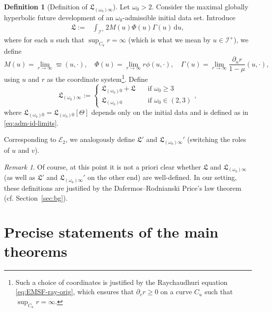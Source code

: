 \documentclass[10pt, reqno]{amsart}
\theoremstyle{definition}
\newtheorem{definition}[theorem]{Definition}
\theoremstyle{remark}
\newtheorem{remark}[theorem]{Remark}
\theoremstyle{conjecture}
\numberwithin{equation}{section}
\newcommand{\ud}{\mathrm{d}}
\newcommand{\rd}{\partial}
\newcommand{\0}{\emptyset}
\newcommand{\Gmm}{\Gamma}
\newcommand{\Tht}{\Theta}
\newcommand{\omg}{\omega}
\newcommand{\calI}{\mathcal I}
\newcommand{\NI}{\calI^{+}}						%
\newcommand{\Ext}{\mathscr{E}}
\begin{document}
\begin{definition}[Definition of $\mathfrak{L}_{(\omg_{0}) \infty}$]\label{def.L}
Let $\omg_0>2$. Consider the maximal globally hyperbolic future development of an $\omg_0$-admissible initial data set. Introduce
\begin{align} \label{eq:L-def}
	\mathfrak{L} :=& \int_{\NI} 2 M(u) \Phi(u) \Gmm(u) \, \ud u,
\end{align}
where for each $u$ such that $\sup_{C_{u}} r = \infty$ (which is what we mean by $u \in \NI$), we define
\begin{equation*}
M(u) = \lim_{r \to \infty} \varpi(u, \cdot), \quad
\Phi(u) = \lim_{r \to \infty} r \phi(u, \cdot), \quad 
\Gmm(u) = \lim_{r \to \infty} \frac{\rd_{u} r}{1- \mu}(u, \cdot),
\end{equation*}
using $u$ and $r$ as the coordinate system\footnote{Such a choice of coordinates is justified by the Raychaudhuri equation \eqref{eq:EMSF-ray-orig}, which ensures that $\rd_{v} r \geq 0$ on a curve $C_{u}$ such that $\sup_{C_{u}} r = \infty$.}.
Define
\begin{equation} \label{eq:Linfty-def}
\mathfrak{L}_{(\omg_{0}) \infty} := \begin{cases}\mathfrak{L}_{(\omg_{0}) 0} + \mathfrak{L}\quad &\mbox{if }\omg_{0}\geq 3\\
\mathfrak{L}_{(\omg_{0}) 0}\quad &\mbox{if } \omg_{0} \in (2,3)
\end{cases}
,
\end{equation}
where $\mathfrak{L}_{(\omg_{0}) 0} = \mathfrak{L}_{(\omg_{0}) 0}[\Tht]$ depends only on the initial data and is defined as in \eqref{eq:adm-id-limits}. 
\end{definition}

Corresponding to $\Ext_2$, we analogously define $\mathfrak{L}'$ and $\mathfrak{L}_{(\omg_{0}) \infty}'$ (switching the roles of $u$ and $v$). 

\begin{remark} 
Of course, at this point it is not a priori clear whether $\mathfrak{L}$ and $\mathfrak{L}_{(\omg_{0}) \infty}$ (as well as $\mathfrak{L}'$ and $\mathfrak{L}_{(\omg_{0}) \infty}'$ on the other end) are well-defined. In our setting, these definitions are justified by the Dafermos--Rodnianski Price's law theorem (cf. Section~\ref{sec:bg}).
\end{remark}

\section{Precise statements of the main theorems}  \label{sec:main-thm}
\end{document}
